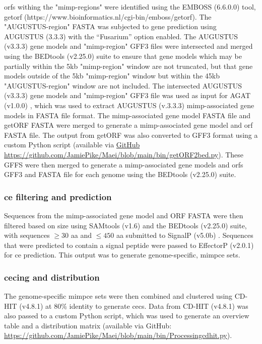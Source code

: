 \Acp{orf} withing the "\ac{mimp}-regions" were identified using the EMBOSS (6.6.0.0) tool, getorf (https://www.bioinformatics.nl/cgi-bin/emboss/getorf). The "AUGUSTUS-region" FASTA was subjected to gene prediction using AUGUSTUS (3.3.3) \parencite{Stanke2006} with the “Fusarium” option enabled. The AUGUSTUS (v3.3.3) gene models and "\ac{mimp}-region" GFF3 files were intersected and merged using the BEDtools (v2.25.0) suite \parencite{Quinlan2010} to ensure that gene models which may be partially within the 5kb "\ac{mimp}-region" window are not truncated, but that gene models outside of the 5kb "\ac{mimp}-region" window but within the 45kb "AUGUSTUS-region" window are not included. The intersected AUGUSTUS (v3.3.3) gene models and "\ac{mimp}-region" GFF3 file was used as input for AGAT (v1.0.0) \parencite{DainatN.D.}, which was used to extract AUGUSTUS (v.3.3.3) \ac{mimp}-associated gene models in FASTA file format. The \ac{mimp}-associated gene model FASTA file and getORF FASTA were merged to generate a \ac{mimp}-associated gene model and \ac{orf} FASTA file. The output from getORF was also converted to GFF3 format using a custom Python script (available via \href{https://github.com/JamiePike/Maei/blob/main/bin/getORF2bed.py}{ GitHub https://githu\-b.com/JamiePike/Maei/blob/main/bin/getORF2bed.py}). These GFFS were then merged to generate a \ac{mimp}-associated gene models and \acp{orf} GFF3 and FASTA file for each genome using the BEDtools (v2.25.0) suite.

\subsubsection{\ac{ce} filtering and prediction}

Sequences from the \ac{mimp}-associated gene model and ORF FASTA were then filtered based on size using SAMtools (v1.6) and the BEDtools (v2.25.0) suite, with sequences $\ge30$ aa and $\le450$ aa submitted to SignalP (v5.0b) \parencite{Petersen2011}. Sequences that were predicted to contain a signal peptide were passed to EffectorP (v2.0.1) \parencite{Sperschneider2018} for \ac{ce} prediction. This output was to generate genome-specific, \ac{mimpce} sets.

\subsubsection{\Acl{cec}ing and distribution}

The genome-specific \ac{mimpce} sets were then combined and clustered using CD-HIT (v4.8.1) \parencite{Fu2012} at 80\% identity to generate \acfp{cec}. Data from CD-HIT (v4.8.1) was also passed to a custom Python script, which was used to generate an overview table and a distribution matrix (available via GitHub: \href{https://github.com/JamiePike/Maei/blob/main/bin/Processingcdhit.py}{https://github.com/Jamie\-Pike/Maei/blob/main/bin/Processingcdhit.py}).

